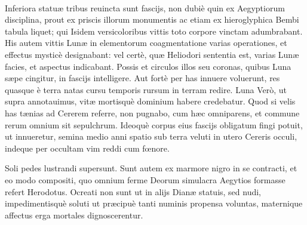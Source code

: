 \documentclass[a4paper, 11pt, oneside, polutonikogreek, latin]{article}
\begin{document}
\paragraph{}
Inferiora statuæ tribus reuincta sunt fascijs, non dubiè quin ex Aegyptiorum disciplina, prout ex priscis illorum monumentis ac etiam ex hieroglyphica Bembi tabula liquet; qui Isidem versicoloribus vittis toto corpore vinctam adumbrabant. His autem vittis Lunæ in elementorum coagmentatione varias operationes, et effectus mysticè designabant: vel certè, quæ Heliodori sententia est, varias Lunæ facies, et aspectus indicabant. Possis et circulos illos seu coronas, quibus Luna sæpe cingitur, in fascijs intelligere. Aut fortè per has innuere voluerunt, res quasque è terra natas cursu temporis rursum in terram redire. Luna Verò, ut supra annotauimus, vitæ mortisquè dominium habere credebatur. Quod si velis has tænias ad Cererem referre, non pugnabo, cum hæc omniparens, et commune rerum omnium sit sepulchrum. Ideoquè corpus eius fascijs obligatum fingi potuit, ut innueretur, semina medio anni spatio sub terra veluti in utero Cereris occuli, indeque per occultam vim reddi cum fœnore.

Soli pedes lustrandi supersunt. Sunt autem ex marmore nigro in se contracti, et eo modo compositi, quo omnium ferme Deorum simulacra Aegytios formasse refert Herodotus. Ocreati non sunt ut in alijs Dianæ statuis, sed nudi, impedimentisquè soluti ut præcipuè tanti numinis propensa voluntas, maternique affectus erga mortales dignoscerentur.
\end{document}

